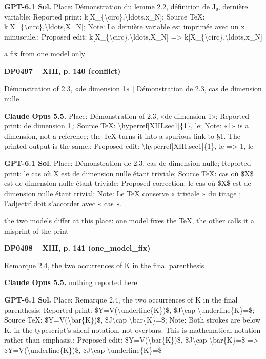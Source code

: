 \textbf{GPT-6.1 Sol.} Place: Démonstration du lemme 2.2, définition de J₀, dernière variable; Reported print: k[X\_\{\textbackslash{}circ\},\textbackslash{}ldots,x\_N]; Source TeX: k[X\_\{\textbackslash{}circ\},\textbackslash{}ldots,X\_N]; Note: La dernière variable est imprimée avec un x minuscule.; Proposed edit: k[X\_\{\textbackslash{}circ\},\textbackslash{}ldots,X\_N] =\allowbreak > k[X\_\{\textbackslash{}circ\},\textbackslash{}ldots,x\_N]\par
a fix from one model only\par
\par\noindent\hypertarget{DP0497}{}\textbf{DP0497 -- XIII, p. 140 (conflict)}\par
Démonstration of 2.3, «de dimension 1» | Démonstration de 2.3, cas de dimension nulle\par
\textbf{Claude Opus 5.5.} Place: Démonstration of 2.3, «de dimension 1»; Reported print: de dimension 1,; Source TeX: \textbackslash{}hyperref[XIII.sec1]\{1\}, le; Note: «1» is a dimension, not a reference; the TeX turns it into a spurious link to §1. The printed output is the same.; Proposed edit: \textbackslash{}hyperref[XIII.sec1]\{1\}, le =\allowbreak > 1, le\par
\textbf{GPT-6.1 Sol.} Place: Démonstration de 2.3, cas de dimension nulle; Reported print: le cas où X est de dimension nulle étant triviale; Source TeX: cas où \$X\$ est de dimension nulle étant triviale; Proposed correction: le cas où \$X\$ est de dimension nulle étant trivial; Note: Le TeX conserve « triviale » du tirage ; l'adjectif doit s'accorder avec « cas ».\par
the two models differ at this place: one model fixes the TeX, the other calls it a misprint of the print\par
\par\noindent\hypertarget{DP0498}{}\textbf{DP0498 -- XIII, p. 141 (one\_model\_fix)}\par
Remarque 2.4, the two occurrences of K in the final parenthesis\par
\textbf{Claude Opus 5.5.} nothing reported here\par
\textbf{GPT-6.1 Sol.} Place: Remarque 2.4, the two occurrences of K in the final parenthesis; Reported print: \$Y=\allowbreak V(\textbackslash{}underline\{K\})\$, \$J\textbackslash{}cap \textbackslash{}underline\{K\}=\$; Source TeX: \$Y=\allowbreak V(\textbackslash{}bar\{K\})\$, \$J\textbackslash{}cap \textbackslash{}bar\{K\}=\$; Note: Both strokes are below K, in the typescript's sheaf notation, not overbars. This is mathematical notation rather than emphasis.; Proposed edit: \$Y=\allowbreak V(\textbackslash{}bar\{K\})\$, \$J\textbackslash{}cap \textbackslash{}bar\{K\}=\$ =\allowbreak > \$Y=\allowbreak V(\textbackslash{}underline\{K\})\$, \$J\textbackslash{}cap \textbackslash{}underline\{K\}=\$\par

